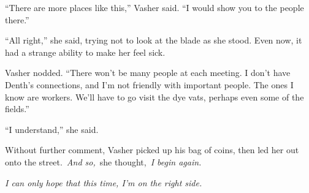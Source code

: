 “There are more places like this,” Vasher said. “I would show you to the people there.”

“All right,” she said, trying not to look at the blade as she stood. Even now, it had a strange ability to make her feel sick.

Vasher nodded. “There won’t be many people at each meeting. I don’t have Denth’s connections, and I’m not friendly with important people. The ones I know are workers. We’ll have to go visit the dye vats, perhaps even some of the fields.”

“I understand,” she said.

Without further comment, Vasher picked up his bag of coins, then led her out onto the street.~\textit{And so,}~she thought,~\textit{I begin again.}

\textit{I can only hope that this time, I’m on the right side.}

